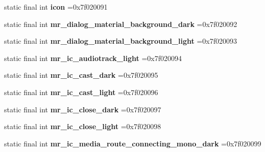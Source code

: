 \begin{DoxyCompactItemize}
\mbox{\label{classproject4_1_1xaria_1_1R_1_1drawable_a1f5a4d8269c6bb88cc4131ef9a560cdc}} 
static final int {\bfseries icon} =0x7f020091
\item 
\mbox{\label{classproject4_1_1xaria_1_1R_1_1drawable_aed93e43958e33ca80e44f285596d0603}} 
static final int {\bfseries mr\+\_\+dialog\+\_\+material\+\_\+background\+\_\+dark} =0x7f020092
\item 
\mbox{\label{classproject4_1_1xaria_1_1R_1_1drawable_a458584d6bbf685a64126a7bb35bf6fb0}} 
static final int {\bfseries mr\+\_\+dialog\+\_\+material\+\_\+background\+\_\+light} =0x7f020093
\item 
\mbox{\label{classproject4_1_1xaria_1_1R_1_1drawable_aac30d895e046422ad6e93117a5fe4cf2}} 
static final int {\bfseries mr\+\_\+ic\+\_\+audiotrack\+\_\+light} =0x7f020094
\item 
\mbox{\label{classproject4_1_1xaria_1_1R_1_1drawable_a993c45bbe5fcf6a05fdd89d03f1b6aad}} 
static final int {\bfseries mr\+\_\+ic\+\_\+cast\+\_\+dark} =0x7f020095
\item 
\mbox{\label{classproject4_1_1xaria_1_1R_1_1drawable_af82a4442adb91ef07c00cd2c81638a49}} 
static final int {\bfseries mr\+\_\+ic\+\_\+cast\+\_\+light} =0x7f020096
\item 
\mbox{\label{classproject4_1_1xaria_1_1R_1_1drawable_ae7726468b57e086fbd38f6363b9ee7d9}} 
static final int {\bfseries mr\+\_\+ic\+\_\+close\+\_\+dark} =0x7f020097
\item 
\mbox{\label{classproject4_1_1xaria_1_1R_1_1drawable_a094957fcc98a299649c85b8c2652136a}} 
static final int {\bfseries mr\+\_\+ic\+\_\+close\+\_\+light} =0x7f020098
\item 
\mbox{\label{classproject4_1_1xaria_1_1R_1_1drawable_a768d0b8f5c463b63356ae1c2783e3d82}} 
static final int {\bfseries mr\+\_\+ic\+\_\+media\+\_\+route\+\_\+connecting\+\_\+mono\+\_\+dark} =0x7f020099

\end{DoxyCompactItemize}
